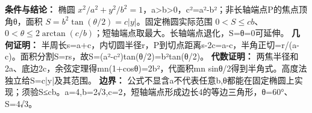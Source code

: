 \textbf{条件与结论：} 椭圆 $x^2/a^2+y^2/b^2=1$，a>b>0，c²=a²-b²；非长轴端点P的焦点顶角θ，面积 $S=b^2\tan(\theta/2)=c|y|$。固定椭圆实际范围 $0<S\le cb$、$0<\theta\le2\arctan(c/b)$；短轴端点取最大。长轴端点退化，S=θ=0可延伸。
\textbf{几何证明：} 半周长s=a+c，内切圆半径r，P到切点距离s-2c=a-c，半角正切=r/(a-c)。面积分割S=rs，故S=(a²-c²)tan(θ/2)=b²tan(θ/2)。
\textbf{代数证明：} 两焦半径和2a、底边2c，余弦定理得mn(1+cosθ)=2b²，代面积mn sinθ/2得到半角式。高度法独立给S=c|y|及其范围。
\textbf{边界：} 公式不显含a不代表任意b,θ都能在固定椭圆上实现；须验S≤cb。a=4,b=2√3,c=2，短轴端点形成边长4的等边三角形，θ=60°、S=4√3。
